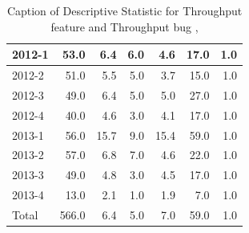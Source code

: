\documentclass[UKenglish]{ifimaster}  %
\begin{document}
\begin{table}[!htbp]
\begin{adjustwidth}{-2.5cm}{}
{{\begin{tabular}{ | l | r | r | r | r | r | r | }
2012-1 & 53.0 & 6.4 & 6.0 & 4.6 & 17.0 & 1.0\\ \hline
2012-2 & 51.0 & 5.5 & 5.0 & 3.7 & 15.0 & 1.0\\ \hline
2012-3 & 49.0 & 6.4 & 5.0 & 5.0 & 27.0 & 1.0\\ \hline
2012-4 & 40.0 & 4.6 & 3.0 & 4.1 & 17.0 & 1.0\\ \hline
2013-1 & 56.0 & 15.7 & 9.0 & 15.4 & 59.0 & 1.0\\ \hline
2013-2 & 57.0 & 6.8 & 7.0 & 4.6 & 22.0 & 1.0\\ \hline
2013-3 & 49.0 & 4.8 & 3.0 & 4.5 & 17.0 & 1.0\\ \hline
2013-4 & 13.0 & 2.1 & 1.0 & 1.9 & 7.0 & 1.0\\ \hline
Total & 566.0 & 6.4 & 5.0 & 7.0 & 59.0 & 1.0\\ \hline
\end{tabular}
}
}
\end{adjustwidth}
\caption[Optional caption for list of figures]{Caption of Descriptive Statistic for Throughput feature and Throughput bug  , }
\label{DS:5:2}
\end{table}
\end{document}
